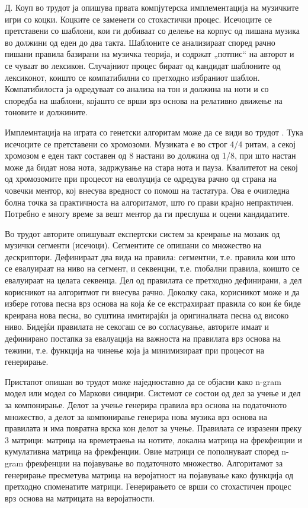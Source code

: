 Д. Коуп во трудот \cite{Cope1991} ја опишува првата компјутерска имплементација на музичките игри со коцки. Коцките се заменети со стохастички процес. Исечоците се претставени со шаблони, кои ги добиваат со делење на корпус од пишана музика во должини од еден до два такта. Шаблоните се анализираат според рачно пишани правила базирани на музичка теорија, и содржат „потпис“ на авторот и се чуваат во лексикон. Случајниот процес бираат од кандидат шаблоните од лексиконот, коишто се компатибилни со претходно избраниот шаблон. Компатибилоста ја одредуваат со анализа на тон и должина на ноти и со споредба на шаблони, којашто се врши врз основа на релативно движење на тоновите и должините.

Имплемнтација на играта со генетски алгоритам може да се види во трудот \cite{Biles1994}. Тука исечоците се претставени со хромозоми. Музиката е во строг 4/4 ритам, а секој хромозом е еден такт составен од 8 настани во должина од 1/8, при што настан може да бидат нова нота, задржување на стара нота и пауза. Квалитетот на секој од хромозомите при процесот на еволуција се одредува рачно од страна на човечки ментор, кој внесува вредност со помош на тастатура. Ова е очигледна болна точка за практичноста на алгоритамот, што го прави крајно непрактичен. Потребно е многу време за вешт ментор да ги преслуша и оцени кандидатите. 

Во трудот \cite{Zils2001} авторите опишуваат експертски систем за креирање на мозаик од музички сегменти (исечоци). Сегментите се опишани со множество на дескриптори. Дефинираат два вида на правила: сегментни, т.е. правила кои што се евалуираат на ниво на сегмент, и секвенцни, т.е. глобални правила, коишто се евалуираат на целата секвенца. Дел од правилата се претходно дефинирани, а дел корисникот на алгоритмот ги внесува рачно. Доколку сака, корисникот може и да избере готова песна врз основа на која ќе се екстрахираат правила со кои ќе биде креирана нова песна, во суштина имитирајќи ја оригиналната песна од високо ниво. Бидејќи правилата не секогаш се во согласување, авторите имаат и дефинирано постапка за евалуација на важноста на правилата врз основа на тежини, т.е. функција на чинење која ја минимизираат при процесот на генерирање.

Пристапот опишан во трудот \cite{GarciaSalas2011} може наједноставно да се објасни како n-gram модел или модел со Маркови синџири. Системот се состои од дел за учење и дел за компонирање. Делот за учење генерира правила врз основа на податочното множество, а делот за компонирање генерира нова музика врз основа на правилата и има повратна врска кон делот за учење. Правилата се изразени преку 3 матрици: матрица на времетраења на нотите, локална матрица на фрекфенции и кумулативна матрица на фрекфенции. Овие матрици се пополнуваат според n-gram фрекфенции на појавување во податочното множество. Алгоритамот за генерирање пресметува матрица на веројатност на појавување како функција од претходно споменатите матрици. Генерирањето се врши со стохастичен процес врз основа на матрицата на веројатности. 

